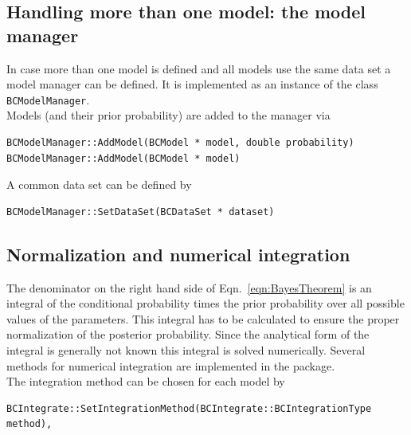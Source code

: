 \documentclass[11pt, a4paper]{article}
\begin{document}

\subsection{Handling more than one model: the model manager} 

In case more than one model is defined and all models use the same
data set a model manager can be defined. It is implemented as an
instance of the class \verb|BCModelManager|. \\ 

\noindent 
Models (and their prior probability) are added to the manager via
\begin{small}
\begin{verbatim}
BCModelManager::AddModel(BCModel * model, double probability) 
BCModelManager::AddModel(BCModel * model) 
\end{verbatim} 
\end{small} 

A common data set can be defined by 
\begin{small}
\begin{verbatim}
BCModelManager::SetDataSet(BCDataSet * dataset) 
\end{verbatim} 
\end{small} 


\subsection{Normalization and numerical integration} 

The denominator on the right hand side of Eqn.~\ref{eqn:BayesTheorem}
is an integral of the conditional probability times the prior
probability over all possible values of the parameters. This integral
has to be calculated to ensure the proper normalization of the
posterior probability. Since the analytical form of the integral is
generally not known this integral is solved numerically. Several
methods for numerical integration are implemented in the package. \\ 

\noindent 
The integration method can be chosen for each model by 
%
\begin{small}
\begin{verbatim}
BCIntegrate::SetIntegrationMethod(BCIntegrate::BCIntegrationType method), 
\end{verbatim} 
\end{small} 
\end{document}
